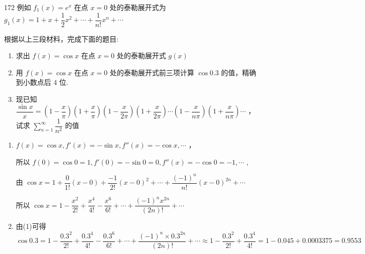 \begin{enumerate}
\begin{enumerate}
\begin{dingautolist}{172}
            例如 ${f}_{1}\left( x\right)  = {{e}}^{x}$ 在点 $x = 0$ 处的泰勒展开式为 ${g}_{1}\left( x\right)  = 1 + x + \dfrac{1}{2}{x}^{2} + \cdots  + \dfrac{1}{n!}{x}^{n} + \cdots$
        \end{dingautolist}
        
        根据以上三段材料，完成下面的题目:
        \begin{enumerate}
            \item 求出 $f\left( x\right)  = \cos x$ 在点 $x = 0$ 处的泰勒展开式 $g\left( x\right)$
            \item 用 $f\left( x\right)  = \cos x$ 在点 $x = 0$ 处的泰勒展开式前三项计算 $\cos {0.3}$ 的值，精确到小数点后 4 位.
            \item 现已知 $\dfrac{\sin x}{x} = \left( {1 - \dfrac{x}{\pi }}\right) \left( {1 + \dfrac{x}{\pi }}\right) \left( {1 - \dfrac{x}{2\pi }}\right) \left( {1 + \dfrac{x}{2\pi }}\right) \cdots \left( {1 - \dfrac{x}{n \pi }}\right) \left( {1 + \dfrac{x}{n \pi }}\right) \cdots$ ，试求 $\mathop{\sum }\limits_{{n = 1}}^{\infty }\dfrac{1}{{n}^{2}}$ 的值
        \end{enumerate}
        \begin{jieda}
            \begin{enumerate}
                \item $f\left( x\right)  = \cos x, f'\left( x\right)  =  - \sin x,{f}''\left( x\right)  =  - \cos x,\cdots$ ，
                
                所以 $f\left( 0\right)  = \cos 0 = 1,f'\left( 0\right)  =  - \sin 0 = 0,{f}''\left( x\right)  =  - \cos 0 =  - 1,\cdots$ ,
                
                由 $\cos x = 1 + \dfrac{0}{1!}\left( {x - 0}\right)  + \dfrac{-1}{2!}{\left( x - 0\right) }^{2} + \cdots  + \dfrac{{\left( -1\right) }^{n}}{n!}{\left( x - 0\right) }^{2n} + \cdots$
                
                所以 $\cos x = 1 - \dfrac{{x}^{2}}{2!} + \dfrac{{x}^{4}}{4!} - \dfrac{{x}^{6}}{6!} + \cdots  + \dfrac{{\left( -1\right) }^{n}{x}^{2n}}{\left( {2n}\right) !} + \cdots$

                \item 由(1)可得 $\cos {0.3} = 1 - \dfrac{{0.3}^{2}}{2!} + \dfrac{{0.3}^{4}}{4!} - \dfrac{{0.3}^{6}}{6!} + \cdots  + \dfrac{{\left( -1\right) }^{n} \times  {0.3}^{2n}}{\left( {2n}\right) !} + \cdots  \approx  1 - \dfrac{{0.3}^{2}}{2!} + \dfrac{{0.3}^{4}}{4!}  = 1 - {0.045} + {0.0003375} = {0.9553}$


\end{enumerate}
\end{jieda}
\end{enumerate}
\end{enumerate}
